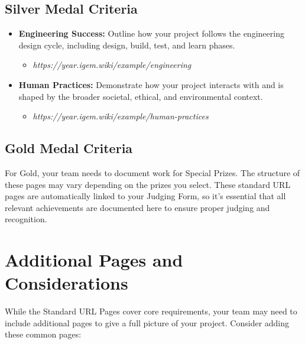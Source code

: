 \subsection*{Silver Medal Criteria} 
\begin{itemize}
    \item \textbf{Engineering Success:} Outline how your project follows the engineering design cycle, including design, build, test, and learn phases.
    \begin{itemize}
        \item  \textit{https://year.igem.wiki/example/engineering}
    \end{itemize}
    \item \textbf{Human Practices:} Demonstrate how your project interacts with and is shaped by the broader societal, ethical, and environmental context.
    \begin{itemize}
        \item  \textit{https://year.igem.wiki/example/human-practices}
    \end{itemize}
\end{itemize}

\subsection*{Gold Medal Criteria} 
For Gold, your team needs to document work for Special Prizes.
The structure of these pages may vary depending on the prizes you select. \newline
These standard URL pages are automatically linked to your Judging Form, so it’s essential that all relevant achievements are documented here to ensure proper judging and recognition.


\section{Additional Pages and Considerations}\label{sec:additional-pages-and-considerations}

While the Standard URL Pages cover core requirements, your team may need to include additional pages to give a full picture of your project.
Consider adding these common pages:

